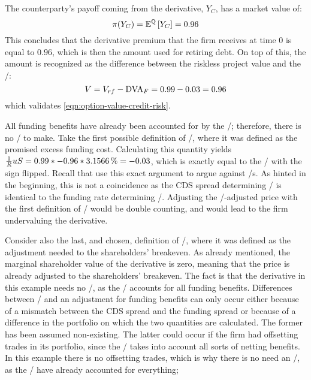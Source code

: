 \documentclass[../main.tex]{subfiles}
\begin{document}
            The counterparty's payoff coming from the derivative, $Y_C$, has a market value of:
            \begin{equation}
                \pi(Y_{C}) = \mathbb{E}^{\mathbb{Q}}\left[Y_{C}\right] = \num{0.96}
            \end{equation}
            This concludes that the derivative premium that the firm receives at time 0 is equal to $\num{0.96}$, 
            which is then the amount used for retiring debt. 
            On top of this, the amount is recognized as the difference between the riskless project value and the \DVA/:
            \begin{equation}
                V = V_{rf} - \DVA/_F = \num{0.99} - \num{0.03} = \num{0.96}
            \end{equation}
            which validates \cref{eqn:option-value-credit-risk}. 

            All funding benefits have already been accounted for by the \DVA/;
            therefore, there is no \FVA/ to make.
            Take the first possible definition of \FVA/, 
            where it was defined as the promised excess funding cost.
            Calculating this quantity yields 
            $\discountfactor u S = \num{0.99} * \num{-0.96} * \pct{0.031566} = \num{-0.03}$,
            which is exactly equal to the \DVA/ with the sign flipped.
            Recall that \textcite{HullWhite2012FVA} use this exact argument to argue against \FVA/s.
            As hinted in the beginning, 
            this is not a coincidence as the CDS spread determining \DVA/
            is identical to the funding rate determining \FVA/.
            Adjusting the \DVA/-adjusted price with the first definition of \FVA/ would be double counting,
            and would lead to the firm undervaluing the derivative.
            
            Consider also the last, and chosen, definition of \FVA/,
            where it was defined as the adjustment needed to the shareholders' breakeven.
            As already mentioned, the marginal shareholder value of the derivative is zero,
            meaning that the price is already adjusted to the shareholders' breakeven.
            The fact is that the derivative in this example needs no \FVA/,
            as the \DVA/ accounts for all funding benefits.
            Differences between \DVA/ and an adjustment for funding benefits can only occur 
            either because of a mismatch between the CDS spread and the funding spread
            or because of a difference in the portfolio on which the two quantities are calculated. 
            The former has been assumed non-existing.
            The latter could occur if the firm had offsetting trades in its portfolio,
            since the \FVA/ takes into account all sorts of netting benefits.
            In this example there is no offsetting trades, 
            which is why there is no need an \FVA/, as the \DVA/ have already accounted for everything;
\end{document}
